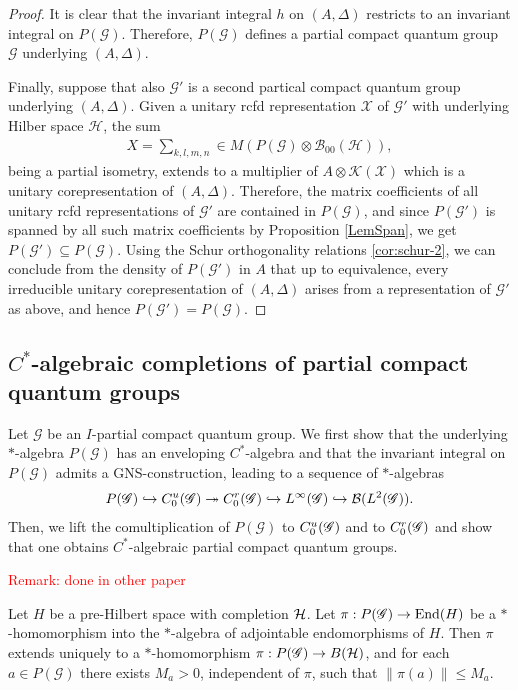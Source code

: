 \begin{proof}
 It is clear that the invariant integral $h$ on $(A,\Delta)$ restricts to an invariant
integral on $P(\mathscr{G})$. Therefore, $P(\mathscr{G})$ defines a partial compact quantum group $\mathscr{G}$ underlying $(A,\Delta)$. 


Finally, suppose that also $\mathscr{G}'$ is a second partical compact quantum group underlying $(A,\Delta)$.   Given  a unitary rcfd representation $\mathscr{X}$ of $\mathscr{G}'$ with underlying Hilber space $\mathscr{H}$, the sum
\begin{align*}
  X=\sum_{k,l,m,n} \in M(P(\mathscr{G}) \otimes \mathcal{B}_{00}(\mathscr{H})),
\end{align*}
being a partial isometry, extends to a multiplier of $A \otimes \mathcal{K}(\mathscr{X})$ which is a unitary corepresentation of $(A,\Delta)$. Therefore, the matrix coefficients of all  unitary rcfd representations of $\mathscr{G}'$ are contained in $P(\mathscr{G})$, and since $P(\mathscr{G'})$ is spanned by all such matrix coefficients by Proposition \ref{LemSpan},  we get $P(\mathscr{G'}) \subseteq P(\mathscr{G})$. Using the Schur orthogonality relations \ref{cor:schur-2}, we can conclude from the density of $P(\mathscr{G'})$ in $A$ that up to equivalence, every  irreducible unitary corepresentation of $(A,\Delta)$ arises from a representation of  $\mathscr{G'}$ as above, and hence  $P(\mathscr{G'}) = P(\mathscr{G})$.
\end{proof}
\subsection{$C^{*}$-algebraic completions of partial compact quantum groups}


 Let $\mathscr{G}$ be an  $I$-partial compact quantum group. We  first show that the  underlying $*$-algebra $P(\mathscr{G})$  has an enveloping  $C^{*}$-algebra and that the invariant integral on $P(\mathscr{G})$ admits  a GNS-construction, leading to a sequence of  $*$-algebras
\begin{align*}
P(\mathscr{G}) \hookrightarrow C^{u}_{0}(\mathscr{G}) \twoheadrightarrow
  C^{r}_{0}(\mathscr{G})\hookrightarrow
L^{\infty}(\mathscr{G}) \hookrightarrow {\cal B}(L^{2}(\mathscr{G})).
\end{align*}
Then, we lift the comultiplication of $P(\mathscr{G})$ to $C^{u}_{0}(\mathscr{G})$ and to $C^{r}_{0}(\mathscr{G})$ and show that one obtains $C^{*}$-algebraic partial compact quantum groups.  

\textcolor{red}{Remark: done in other paper}

\begin{Lem}\label{LemUniBound}
 Let $H$ be a pre-Hilbert space with completion $\mathcal{H}$. Let $\pi: P(\mathscr{G})\rightarrow \operatorname{\mathrm{End}}(H)$ be a $*$-homomorphism into the $*$-algebra of adjointable endomorphisms of $H$. Then $\pi$ extends uniquely to a $*$-homomorphism $\pi: P(\mathscr{G})\rightarrow B(\mathcal{H})$, and for each $a\in P(\mathscr{G})$ there exists $M_a>0$, independent of $\pi$, such that $\|\pi(a)\|\leq M_a$.
\end{Lem} 

